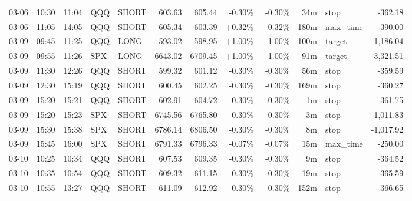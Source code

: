 \documentclass[11pt,a4paper,twoside]{article}
\begin{document}
\begin{center}
\begin{longtable}{>{\color{txtmain}}l l l l l r r r r r >{\color{txtmain}}l r}
03-06 & 10:30 & 11:04 & QQQ & SHORT & 603.63 & 605.44 & \textcolor{lossred}{-0.30\%} & \textcolor{lossred}{-0.30\%} & 34m & stop & \textcolor{lossred}{-362.18} \\
03-06 & 11:05 & 14:05 & QQQ & SHORT & 605.34 & 603.39 & \textcolor{wingreen}{+0.32\%} & \textcolor{wingreen}{+0.32\%} & 180m & max\_time & \textcolor{wingreen}{390.00} \\
03-09 & 09:45 & 11:25 & QQQ & LONG & 593.02 & 598.95 & \textcolor{wingreen}{+1.00\%} & \textcolor{wingreen}{+1.00\%} & 100m & target & \textcolor{wingreen}{1,186.04} \\
03-09 & 09:55 & 11:26 & SPX & LONG & 6643.02 & 6709.45 & \textcolor{wingreen}{+1.00\%} & \textcolor{wingreen}{+1.00\%} & 91m & target & \textcolor{wingreen}{3,321.51} \\
03-09 & 11:30 & 12:26 & QQQ & SHORT & 599.32 & 601.12 & \textcolor{lossred}{-0.30\%} & \textcolor{lossred}{-0.30\%} & 56m & stop & \textcolor{lossred}{-359.59} \\
03-09 & 12:30 & 15:19 & QQQ & SHORT & 600.45 & 602.25 & \textcolor{lossred}{-0.30\%} & \textcolor{lossred}{-0.30\%} & 169m & stop & \textcolor{lossred}{-360.27} \\
03-09 & 15:20 & 15:21 & QQQ & SHORT & 602.91 & 604.72 & \textcolor{lossred}{-0.30\%} & \textcolor{lossred}{-0.30\%} & 1m & stop & \textcolor{lossred}{-361.75} \\
03-09 & 15:20 & 15:23 & SPX & SHORT & 6745.56 & 6765.80 & \textcolor{lossred}{-0.30\%} & \textcolor{lossred}{-0.30\%} & 3m & stop & \textcolor{lossred}{-1,011.83} \\
03-09 & 15:30 & 15:38 & SPX & SHORT & 6786.14 & 6806.50 & \textcolor{lossred}{-0.30\%} & \textcolor{lossred}{-0.30\%} & 8m & stop & \textcolor{lossred}{-1,017.92} \\
03-09 & 15:45 & 16:00 & SPX & SHORT & 6791.33 & 6796.33 & \textcolor{lossred}{-0.07\%} & \textcolor{lossred}{-0.07\%} & 15m & max\_time & \textcolor{lossred}{-250.00} \\
03-10 & 10:25 & 10:34 & QQQ & SHORT & 607.53 & 609.35 & \textcolor{lossred}{-0.30\%} & \textcolor{lossred}{-0.30\%} & 9m & stop & \textcolor{lossred}{-364.52} \\
03-10 & 10:35 & 10:54 & QQQ & SHORT & 609.32 & 611.15 & \textcolor{lossred}{-0.30\%} & \textcolor{lossred}{-0.30\%} & 19m & stop & \textcolor{lossred}{-365.59} \\
03-10 & 10:55 & 13:27 & QQQ & SHORT & 611.09 & 612.92 & \textcolor{lossred}{-0.30\%} & \textcolor{lossred}{-0.30\%} & 152m & stop & \textcolor{lossred}{-366.65} \\

\end{longtable}
\end{center}
\end{document}
